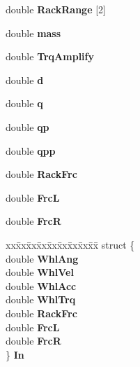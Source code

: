 \begin{DoxyCompactItemize}
double {\bfseries Rack\+Range} \mbox{[}2\mbox{]}
\item 
\mbox{\label{structt_my_model_a1f94fa894514b70f7f6ecfa9a6ff7e3f}} 
double {\bfseries mass}
\item 
\mbox{\label{structt_my_model_aa3bc3841ab0260251b732de0d9f9e56e}} 
double {\bfseries Trq\+Amplify}
\item 
\mbox{\label{structt_my_model_a4c6090472bfc80f4afbafac134bcbff6}} 
double {\bfseries d}
\item 
\mbox{\label{structt_my_model_a3fdfad827808d9cb0cb29dbf0a906d1f}} 
double {\bfseries q}
\item 
\mbox{\label{structt_my_model_a558fc38c29454adb52bc10efb74a0e55}} 
double {\bfseries qp}
\item 
\mbox{\label{structt_my_model_a10e29b675a6c49ba2d308c6236d5fee0}} 
double {\bfseries qpp}
\item 
\mbox{\label{structt_my_model_af827dc5115173538c71cd25e5ae48041}} 
double {\bfseries Rack\+Frc}
\item 
\mbox{\label{structt_my_model_ab0717e84efc8d3c3e9ba7cfd3daa6928}} 
double {\bfseries FrcL}
\item 
\mbox{\label{structt_my_model_a1210a7545bb443a0dfaa6598d993c780}} 
double {\bfseries FrcR}
\item 
\mbox{\label{structt_my_model_a54a8d7b94610e9c0e1dfe6cf7506df8e}} 
\begin{tabbing}
xx\=xx\=xx\=xx\=xx\=xx\=xx\=xx\=xx\=\kill
struct \{\\
\>double {\bfseries WhlAng}\\
\>double {\bfseries WhlVel}\\
\>double {\bfseries WhlAcc}\\
\>double {\bfseries WhlTrq}\\
\>double {\bfseries RackFrc}\\
\>double {\bfseries FrcL}\\
\>double {\bfseries FrcR}\\
\} {\bfseries In}\\


\end{tabbing}
\end{DoxyCompactItemize}
